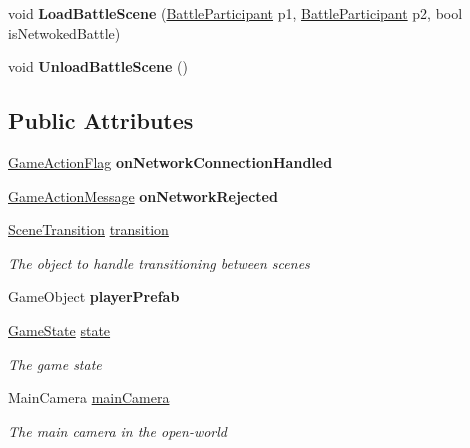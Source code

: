 \begin{DoxyCompactItemize}
\item 
\hypertarget{class_game_manager_a9d3b6a3fb49a9402e1afde9224a12e21}{void {\bfseries Load\-Battle\-Scene} (\hyperlink{class_battle_participant}{Battle\-Participant} p1, \hyperlink{class_battle_participant}{Battle\-Participant} p2, bool is\-Netwoked\-Battle)}\label{class_game_manager_a9d3b6a3fb49a9402e1afde9224a12e21}

\item 
\hypertarget{class_game_manager_a4b49768a7f34b0f3795741f997eca643}{void {\bfseries Unload\-Battle\-Scene} ()}\label{class_game_manager_a4b49768a7f34b0f3795741f997eca643}

\end{DoxyCompactItemize}
\subsection*{Public Attributes}
\begin{DoxyCompactItemize}
\item 
\hypertarget{class_game_manager_a87d481fe88a1765f436ea5764cd1a21a}{\hyperlink{class_game_manager_1_1_game_action_flag}{Game\-Action\-Flag} {\bfseries on\-Network\-Connection\-Handled}}\label{class_game_manager_a87d481fe88a1765f436ea5764cd1a21a}

\item 
\hypertarget{class_game_manager_af977df043b83671ab9a4753b90fbf75b}{\hyperlink{class_game_manager_1_1_game_action_message}{Game\-Action\-Message} {\bfseries on\-Network\-Rejected}}\label{class_game_manager_af977df043b83671ab9a4753b90fbf75b}

\item 
\hyperlink{class_scene_transition}{Scene\-Transition} \hyperlink{class_game_manager_abae15982d4eb90ef9e5f3d24d15e22f2}{transition}
\begin{DoxyCompactList}\small\item\em The object to handle transitioning between scenes \end{DoxyCompactList}\item 
\hypertarget{class_game_manager_a57d400c7a28f42865048fbdbaf236cfb}{Game\-Object {\bfseries player\-Prefab}}\label{class_game_manager_a57d400c7a28f42865048fbdbaf236cfb}

\item 
\hyperlink{class_game_state}{Game\-State} \hyperlink{class_game_manager_a8d86b330237462e38933b28276ed0e2c}{state}
\begin{DoxyCompactList}\small\item\em The game state \end{DoxyCompactList}\item 
Main\-Camera \hyperlink{class_game_manager_aafd6b83529911d9e32cc4b79bd477d74}{main\-Camera}
\begin{DoxyCompactList}\small\item\em The main camera in the open-\/world \end{DoxyCompactList}\end{DoxyCompactItemize}
